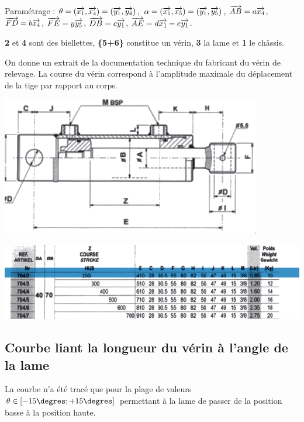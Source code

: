 \documentclass[10pt,fleqn]{article} %
\begin{document}
\begin{multicols}{2}
Paramétrage : $\theta = \left(\overrightarrow{x_1},\overrightarrow{x_4}\right)= \left(\overrightarrow{y_1},\overrightarrow{y_4}\right)$, 
$\alpha = \left(\overrightarrow{x_1},\overrightarrow{x_5}\right)= \left(\overrightarrow{y_1},\overrightarrow{y_5}\right)$, $\overrightarrow{AB}=a\overrightarrow{x_4}$,  
$\overrightarrow{FD}=b\overrightarrow{x_4}$, $\overrightarrow{FE}=y\overrightarrow{y_5}$, $\overrightarrow{DB}=c\overrightarrow{y_1}$, 
$\overrightarrow{AE}=d\overrightarrow{x_1}-e\overrightarrow{y_1}$.

\textbf{2} et \textbf{4} sont des biellettes, \textbf{\{5+6\}} constitue
un vérin, \textbf{3} la lame et \textbf{1} le châssis.

On donne un extrait de la documentation technique du fabricant du vérin de relevage. La course du vérin correspond à l’amplitude maximale du déplacement de la tige par rapport au corps.


\begin{center}
\includegraphics[width=\linewidth]{images/fig_04}
\end{center}

\begin{center}
\includegraphics[width=\linewidth]{images/fig_05}
\end{center}


\subsection*{Courbe liant la longueur du vérin à l’angle de la lame}
La courbe n’a été tracé que pour la plage de valeurs $\theta\in\left[-15\degres;+15\degres \right]$ permettant à
la lame de passer de la position basse à la
position haute.



\end{multicols}
\end{document}
